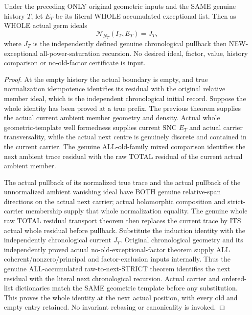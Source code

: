\begin{theorem}
\label{hir:sharp-actual-finite-ambient-trace-chronological-residual}
\leanok
Under the preceding ONLY original geometric inputs and the SAME genuine
history $T$, let $E_T$ be its literal WHOLE accumulated exceptional list.
Then as WHOLE actual germ ideals
\[
 \mathcal N_{N_T}(I_T,E_T)=J_T,
\]
where $J_T$ is the independently defined genuine chronological pullback
then NEW-exceptional all-power-saturation recursion. No desired ideal,
factor, value, history comparison or no-old-factor certificate is input.
\end{theorem}
\begin{proof}
At the empty history the actual boundary is empty, and true normalization
idempotence identifies its residual with the original relative member ideal,
which is the independent chronological initial record. Suppose the whole
identity has been proved at a true prefix. The previous theorem supplies
the actual current ambient member geometry and density. Actual whole
geometric-template well formedness supplies current SNC $E_T$ and actual
carrier transversality, while the actual next centre is genuinely discrete
and contained in the current carrier. The genuine ALL-old-family mixed
comparison identifies the next ambient trace residual with the raw TOTAL
residual of the current actual ambient member.

The actual pullback of its normalized true trace and the actual pullback of
the unnormalized ambient vanishing ideal have BOTH genuine relative-span
directions on the actual next carrier; actual holomorphic composition and
strict-carrier membership supply that whole normalization equality. The
genuine whole raw TOTAL residual transport theorem then replaces the
current trace by ITS actual whole residual before pullback. Substitute the
induction identity with the independently chronological current $J_T$.
Original chronological geometry and its independently proved actual
no-old-exceptional-factor theorem supply ALL coherent/nonzero/principal
and factor-exclusion inputs internally. Thus the genuine ALL-accumulated
raw-to-next-STRICT theorem identifies the next residual with the literal
next chronological recursion. Actual carrier and ordered-list dictionaries
match the SAME geometric template before any substitution. This proves the
whole identity at the next actual position, with every old and empty entry
retained. No invariant rebasing or canonicality is invoked.
\end{proof}

